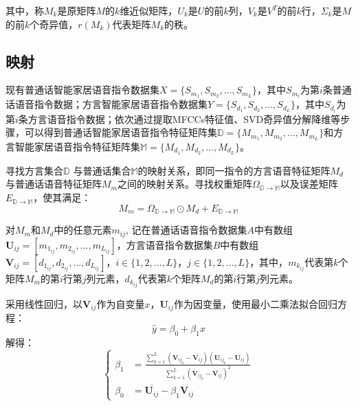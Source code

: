 \documentclass[lang=cn,cite=super]{elegantpaper}
\begin{document}
其中，称$M_k$是原矩阵$M$的$k$维近似矩阵，$U_k$是$U$的前$k$列，$V_k$是$V^T$的前$k$行，$\Sigma_k$是$M$的前$k$个奇异值，$r(M_k)$代表矩阵$M_k$的秩。

\subsection{映射}
现有普通话智能家居语音指令数据集$X=\{S_{m_1}, S_{m_2}, \ldots, S_{m_L}\}$，其中$S_{m_i}$为第$i$条普通话语音指令数据；方言智能家居语音指令数据集$Y=\{S_{d_1}, S_{d_2}, \ldots, S_{d_L}\}$，其中$S_{d_i}$为第$i$条方言语音指令数据；依次通过提取MFCCs特征值、SVD奇异值分解降维等步骤，可以得到普通话智能家居语音指令特征矩阵集$\mathbb{D} = \{ M_{m_1}, M_{m_2}, \ldots, M_{m_L}\}$和方言智能家居语音指令特征矩阵集$\mathbb{M} = \{ M_{d_1}, M_{d_2}, \ldots, M_{d_L}\}$。

寻找方言集合$\mathbb{D}$ 与普通话集合$\mathbb{M}$的映射关系，即同一指令的方言语音特征矩阵$M_d$与普通话语音特征矩阵$M_m$之间的映射关系。寻找权重矩阵$\Omega_{\mathbb{D}\rightarrow \mathbb{M}}$以及误差矩阵$E_{\mathbb{D}\rightarrow \mathbb{M}}$，使其满足：
\begin{equation}
    M_m = \Omega_{\mathbb{D}\rightarrow  \mathbb{M}} \odot M_d + E_{\mathbb{D}\rightarrow \mathbb {M}}
\end{equation}

对$M_m$和$M_d$中的任意元素$m_{ij}$, 记在普通话语音指令数据集$A$中有数组$\mathbf{U}_{ij} = [m_{1_{ij}}, m_{2_{ij}}, \ldots, m_{L_{ij}}]$，方言语音指令数据集$B$中有数组$\mathbf{V}_{ij} = [d_{1_{ij}}, d_{2_{ij}}, \ldots, d_{L_{ij}}]$，$i \in \{ 1, 2, \ldots, L\}$，$j \in \{ 1, 2, \ldots, L\}$，其中，$m_{k_{ij}}$代表第$k$个矩阵$M_m$的第$i$行第$j$列元素，$d_{k_{ij}}$代表第$k$个矩阵$M_d$的第$i$行第$j$列元素。

采用线性回归，以$\mathbf{V}_{ij}$作为自变量$x$，$\mathbf{U}_{ij}$作为因变量，使用最小二乘法拟合回归方程：
\begin{equation}
    \hat{y} = \beta_0 + \beta_1 x
\end{equation}
解得：
\begin{equation}
    \left\{ 
    \begin{aligned}
           \beta_1 &= \frac{\sum_{k=1}^{L} (\mathbf{V}_{{ij}_k}-\overline{\mathbf{V}_{ij}}) (\mathbf{U}_{{ij}_k}-\overline{\mathbf{U}_{ij}})}{\sum_{k=1}^{L} (\mathbf{V}_{{ij}_k}-\overline{\mathbf{V}_{ij}})^2}\\
        \beta_0 &= \overline{\mathbf{U}_{ij}}-\beta_1 \overline{\mathbf{V}_{ij}}
    \end{aligned}
    \right.
\end{equation}
\end{document}
